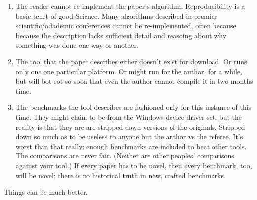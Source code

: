 \documentclass[conference]{IEEEtran}
\begin{document}
\begin{enumerate}

\item The reader cannot re-implement the paper's
  algorithm. Reproducibility is a basic tenet of good Science. Many
  algorithms described in premier scientific/adademic conferences
  cannot be re-implemented, often because because the description
  lacks sufficient detail and reasoing about why something was done
  one way or another.

\item The tool that the paper describes either doesn't exist for
  download. Or runs only one one particular platform. Or might run for
  the author, for a while, but will bot-rot so soon that even the
  author cannot compile it in two months time.

\item The benchmarks the tool describes are fashioned only for this
  instance of this time. They might claim to be from the Windows
  device driver set, but the reality is that they are are stripped
  down versions of the originals. Stripped down so much as to be
  useless to anyone but the author vs the referee. It's worst than
  that really: enough benchmarks are included to beat other tools. The
  comparisons are never fair. (Neither are other peoples' comparisons
  against your tool.) If every paper has to be novel, then every
  benchmark, too, will be novel; there is no historical truth in new,
  crafted benchmarks.
\end{enumerate}

Things can be much better. 
\end{document}
